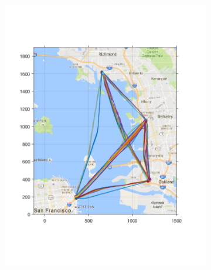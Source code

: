\begin{figure}[!htb]
 \centering
\begin{subfigure}{0.5\columnwidth}
  \includegraphics[width=\columnwidth]{figs/bayArea_d11sep5}
  \subcaption{}
  \label{fig:bayArea_d11sep5}
\end{subfigure}%
\begin{subfigure}{0.5\columnwidth}

\end{subfigure}
\end{figure}
